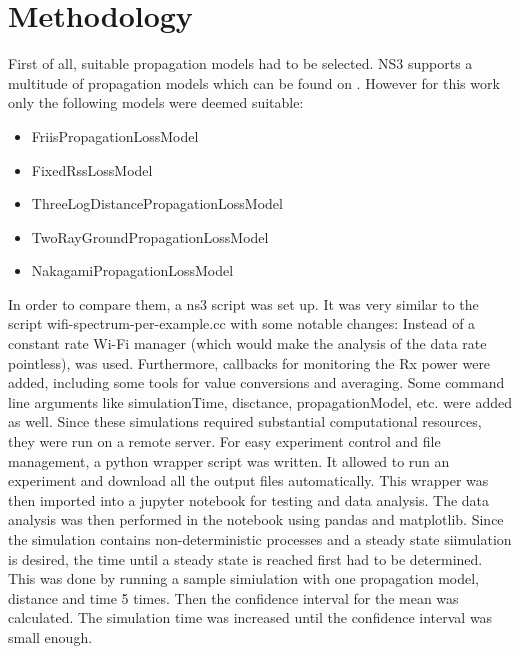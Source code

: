 \section[short]{Methodology}

First of all, suitable propagation models had to be selected.
NS3 supports a multitude of propagation models which can be found on \cite[the ns3 website]{ns3prpmod}.
However for this work only the following models were deemed suitable:
\begin{itemize}
    \item FriisPropagationLossModel
    \item FixedRssLossModel
    \item ThreeLogDistancePropagationLossModel
    \item TwoRayGroundPropagationLossModel
    \item NakagamiPropagationLossModel
\end{itemize}
In order to compare them, a ns3 script was set up. It was very similar to the script wifi-spectrum-per-example.cc 
with some notable changes: Instead of a constant rate Wi-Fi manager (which would make the analysis of the data rate 
pointless), %
was used. Furthermore, callbacks for monitoring the Rx power were added, including some tools for value conversions and
averaging. Some command line arguments like simulationTime, disctance, propagationModel, etc. were added as well.
Since these simulations required substantial computational resources, they were run on a remote server. 
For easy experiment control and file management, a python wrapper script was written. It allowed to run an experiment 
and download all the output files automatically. This wrapper was then imported into a jupyter notebook for 
testing and data analysis. The data analysis was then performed in the notebook using pandas and matplotlib.
Since the simulation contains non-deterministic processes and a steady state siimulation is desired,
the time until a steady state is reached first had to be determined. This was done by running a sample simiulation 
with one propagation model, distance and time 5 times. Then the confidence interval for the mean was calculated.
The simulation time was increased until the confidence interval was small enough. 



